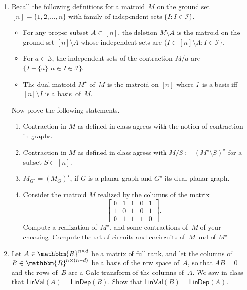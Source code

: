 \documentclass[11pt]{amsart}
\newcommand{\RR}{\mathbbm{R}}
\newcommand{\defn}[1]{{\color{blue}#1}}
\begin{document}
\bigskip
\begin{enumerate}
\item Recall the following definitions for a matroid~$M$ on the ground set $[n]=\{1,2,\dots,n\}$ with family of  independent sets $\{I:I\in\mathcal I\}$.

  \smallskip
\begin{itemize}[$\triangleright$]
\item
  For any proper subset $A\subset[n]$, the \defn{deletion}
  $M\setminus A$ is the matroid on the ground set $[n]\setminus A$ whose
  independent sets are $\{I\subset[n]\setminus A : I\in\mathcal I\}$.

\item
  For $a\in E$, the independent sets of the \defn{contraction} $M/a$ are $\big\{I-\{a\}:a\in I\in\mathcal I\big\}$.
  
\item
  The \defn{dual matroid} $M^\star$ of~$M$ is the matroid on $[n]$ where $I$~is a basis iff $[n]\setminus I$ is a basis~of~$M$.
\end{itemize}

\smallskip

Now prove the following statements.

\smallskip

  \begin{enumerate}
  \item Contraction in $M$ as defined in class agrees with the notion of
    contraction in graphs.
  \item Contraction in $M$ as defined in class agrees with $M/S := (M^\star\setminus S)^\star$ for a subset $S\subset[n]$.
  \item $M_{G^\star} = (M_G)^\star$, if $G$ is a planar graph and $G^\star$ its dual planar graph.
  \item 
    Consider the matroid $M$ realized by the columns of the matrix
    \[
      \begin{bmatrix}
        0 & 1 & 1 & 0 & 1 \\
        1 & 0 & 1 & 0 & 1 \\
        0 & 1 & 1 & 1 & 0
      \end{bmatrix}.
    \]
    Compute a realization of~$M^\star$, and some contractions of~$M$ of your choosing.
    Compute the set of circuits and cocircuits of~$M$ and of $M^\star$.
  \end{enumerate}

  \bigskip

\item
  Let $A\in\RR^{n \times d}$ be a matrix of full rank, and let the columns of $B\in\RR^{n\times(n-d)}$ be a basis of the row space of~$A$,
  so that $AB=0$ and the rows of~$B$ are a Gale transform of the columns of~$A$.
  We saw in class that $\mathsf{LinVal}(A)=\mathsf{LinDep}(B)$.
  Show that $\mathsf{LinVal}(B) = \mathsf{LinDep}(A)$.


\end{enumerate}
\end{document}
